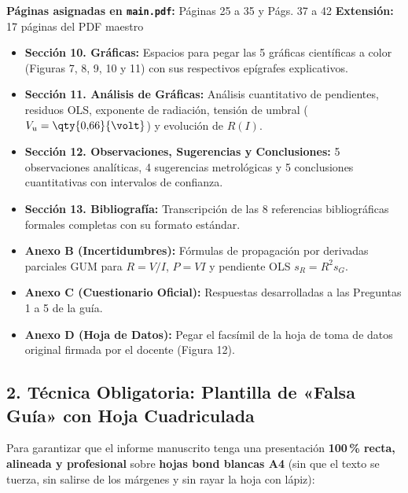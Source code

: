 \documentclass[a4paper, 10pt]{article}
\begin{document}
\begin{tcolorbox}[title=BLOQUE 3 — Asignado a: Piero Alejandro Sánchez Feril, colframe=box-purple]
    \footnotesize
    \textbf{Páginas asignadas en \texttt{main.pdf}:} Páginas 25 a 35 y Págs. 37 a 42 \hfill \textbf{Extensión:} 17 páginas del PDF maestro
    \begin{itemize}[leftmargin=1.5em, itemsep=1.2pt, topsep=1pt]
        \item \textbf{Sección 10. Gráficas:} Espacios para pegar las 5 gráficas científicas a color (Figuras 7, 8, 9, 10 y 11) con sus respectivos epígrafes explicativos.
        \item \textbf{Sección 11. Análisis de Gráficas:} Análisis cuantitativo de pendientes, residuos OLS, exponente de radiación, tensión de umbral ($V_u = \qty{0{,}66}{\volt}$) y evolución de $R(I)$.
        \item \textbf{Sección 12. Observaciones, Sugerencias y Conclusiones:} 5 observaciones analíticas, 4 sugerencias metrológicas y 5 conclusiones cuantitativas con intervalos de confianza.
        \item \textbf{Sección 13. Bibliografía:} Transcripción de las 8 referencias bibliográficas formales completas con su formato estándar.
        \item \textbf{Anexo B (Incertidumbres):} Fórmulas de propagación por derivadas parciales GUM para $R = V/I$, $P = VI$ y pendiente OLS $s_R = R^2 s_G$.
        \item \textbf{Anexo C (Cuestionario Oficial):} Respuestas desarrolladas a las Preguntas 1 a 5 de la guía.
        \item \textbf{Anexo D (Hoja de Datos):} Pegar el facsímil de la hoja de toma de datos original firmada por el docente (Figura 12).
    \end{itemize}
\end{tcolorbox}

\newpage

\subsection*{\color{uni-blue}2. Técnica Obligatoria: Plantilla de «Falsa Guía» con Hoja Cuadriculada}

Para garantizar que el informe manuscrito tenga una presentación \textbf{100\,\% recta, alineada y profesional} sobre \textbf{hojas bond blancas A4} (sin que el texto se tuerza, sin salirse de los márgenes y sin rayar la hoja con lápiz):
\end{document}
